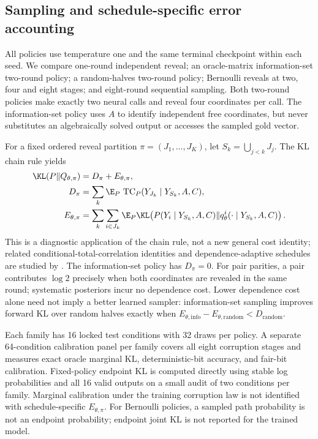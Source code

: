 \subsection{Sampling and schedule-specific error accounting}
All policies use temperature one and the same terminal checkpoint within each seed. We compare one-round independent reveal; an oracle-matrix information-set two-round policy; a random-halves two-round policy; Bernoulli reveals at two, four and eight stages; and eight-round sequential sampling. Both two-round policies make exactly two neural calls and reveal four coordinates per call. The information-set policy uses $A$ to identify independent free coordinates, but never substitutes an algebraically solved output or accesses the sampled gold vector.

For a fixed ordered reveal partition $\pi=(J_1,\ldots,J_K)$, let $S_k=\bigcup_{j<k}J_j$. The KL chain rule yields
\begin{align}
\KL(P\Vert Q_{\theta,\pi})
&=D_\pi+E_{\theta,\pi},\\
D_\pi&=\sum_k\E_P\,\operatorname{TC}_P(Y_{J_k}\mid Y_{S_k},A,C),\\
E_{\theta,\pi}&=\sum_k\sum_{i\in J_k}\E_P\KL\!\left(P(Y_i\mid Y_{S_k},A,C)\Vert q_\theta^i(\cdot\mid Y_{S_k},A,C)\right).
\end{align}
This is a diagnostic application of the chain rule, not a new general cost identity; related conditional-total-correlation identities and dependence-adaptive schedules are studied by \citet{ctcdepth2026,intrinsicdependence2026}. The information-set policy has $D_\pi=0$. For pair parities, a pair contributes $\log2$ precisely when both coordinates are revealed in the same round; systematic posteriors incur no dependence cost. Lower dependence cost alone need not imply a better learned sampler: information-set sampling improves forward KL over random halves exactly when $E_{\theta,\mathrm{info}}-E_{\theta,\mathrm{random}}<D_{\mathrm{random}}$.

Each family has 16 locked test conditions with 32 draws per policy. A separate 64-condition calibration panel per family covers all eight corruption stages and measures exact oracle marginal KL, deterministic-bit accuracy, and fair-bit calibration. Fixed-policy endpoint KL is computed directly using stable log probabilities and all 16 valid outputs on a small audit of two conditions per family. Marginal calibration under the training corruption law is not identified with schedule-specific $E_{\theta,\pi}$. For Bernoulli policies, a sampled path probability is not an endpoint probability; endpoint joint KL is not reported for the trained model.

